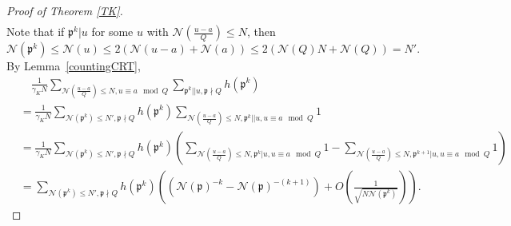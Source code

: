 \documentclass[11pt]{amsart}
\theoremstyle{definition}
\newcommand{\NN}{{\mathcal N}}
\newcommand{\mf}{\mathfrak}
\begin{document}
\begin{proof}[Proof of Theorem \ref{TK}]
\begin{equation}
\begin{split}
    \end{split}
\end{equation}
%
 Note that if $\mf p^{k}\vert u$ for some $u$ with $\NN(\frac{u-a}{Q})\leq N$, then
$$\NN(\mf p^{k})\leq \NN(u)\leq 2(\NN(u-a)+\NN(a))\leq 2(\NN(Q)N+\NN(Q))=N'.$$ 
By Lemma~\ref{countingCRT},
\begin{equation}\label{firstTK2}
    \begin{split}
        &\quad 
        \frac{1}{\gamma_{K} N}\sum_{\NN(\frac{u-a}{Q})\leq N, u\equiv a \mod Q}\sum_{\mf p^{k}|| u, \mf p\nmid Q} h(\mf p^{k})
        \\&=\frac{1}{\gamma_{K} N}\sum_{\NN(\mf p^{k})\leq N', \mf p\nmid Q}h(\mf p^{k})\sum_{\NN(\frac{u-a}{Q})\leq N, \mf p^{k}||u, u\equiv a \mod Q} 1
    \\& =\frac{1}{\gamma_{K} N}\sum_{\NN(\mf p^{k})\leq N', \mf p\nmid Q}h(\mf p^{k})\left(\sum_{\NN(\frac{u-a}{Q})\leq N, \mf p^{k}|u, u\equiv a \mod Q} 1-\sum_{\NN(\frac{u-a}{Q})\leq N, \mf p^{k+1}|u, u\equiv a \mod Q} 1\right)
    \\&=\sum_{\NN(\mf p^{k})\leq N', \mf p\nmid Q}h(\mf p^{k})\left((\NN(\mf p)^{-k}-\NN(\mf p)^{-(k+1)})+O\left(\frac{1}{\sqrt{N\NN(\mf p^{k})}}\right)\right).
    \end{split}
\end{equation}

\end{proof}
\end{document}
